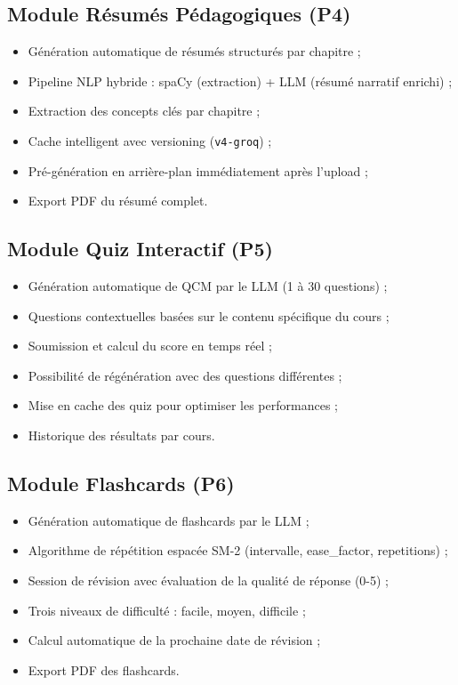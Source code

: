 \subsection{Module Résumés Pédagogiques (P4)}
\begin{itemize}
  \item Génération automatique de résumés structurés par chapitre ;
  \item Pipeline NLP hybride : spaCy (extraction) + LLM (résumé narratif enrichi) ;
  \item Extraction des concepts clés par chapitre ;
  \item Cache intelligent avec versioning (\texttt{v4-groq}) ;
  \item Pré-génération en arrière-plan immédiatement après l'upload ;
  \item Export PDF du résumé complet.
\end{itemize}

\subsection{Module Quiz Interactif (P5)}
\begin{itemize}
  \item Génération automatique de QCM par le LLM (1 à 30 questions) ;
  \item Questions contextuelles basées sur le contenu spécifique du cours ;
  \item Soumission et calcul du score en temps réel ;
  \item Possibilité de régénération avec des questions différentes ;
  \item Mise en cache des quiz pour optimiser les performances ;
  \item Historique des résultats par cours.
\end{itemize}

\subsection{Module Flashcards (P6)}
\begin{itemize}
  \item Génération automatique de flashcards par le LLM ;
  \item Algorithme de répétition espacée SM-2 (intervalle, ease\_factor, repetitions) ;
  \item Session de révision avec évaluation de la qualité de réponse (0-5) ;
  \item Trois niveaux de difficulté : facile, moyen, difficile ;
  \item Calcul automatique de la prochaine date de révision ;
  \item Export PDF des flashcards.
\end{itemize}

